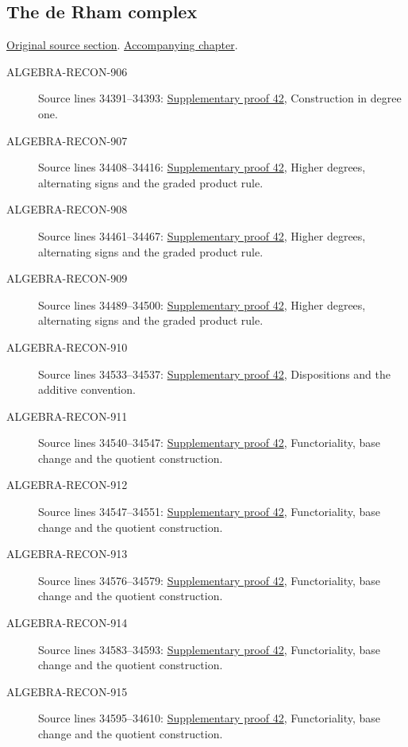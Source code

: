 \subsection{The de Rham complex}
\hypertarget{algebra-source-section-de-rham-complex}{}
\noindent\href{https://github.com/stacks/stacks-project/blob/a04446e57ec1fbc252a871afcec7752fb2807b14/algebra.tex\#L34387}{Original source section}. \href{algebra.pdf\#nameddest=section-de-rham-complex}{Accompanying chapter}.

\begin{description}
\item[ALGEBRA-RECON-906] Source lines 34391--34393: \hyperlink{algebra_de_rham_notes_20260928}{Supplementary proof 42}, Construction in degree one.
\item[ALGEBRA-RECON-907] Source lines 34408--34416: \hyperlink{algebra_de_rham_notes_20260928}{Supplementary proof 42}, Higher degrees, alternating signs and the graded product rule.
\item[ALGEBRA-RECON-908] Source lines 34461--34467: \hyperlink{algebra_de_rham_notes_20260928}{Supplementary proof 42}, Higher degrees, alternating signs and the graded product rule.
\item[ALGEBRA-RECON-909] Source lines 34489--34500: \hyperlink{algebra_de_rham_notes_20260928}{Supplementary proof 42}, Higher degrees, alternating signs and the graded product rule.
\item[ALGEBRA-RECON-910] Source lines 34533--34537: \hyperlink{algebra_de_rham_notes_20260928}{Supplementary proof 42}, Dispositions and the additive convention.
\item[ALGEBRA-RECON-911] Source lines 34540--34547: \hyperlink{algebra_de_rham_notes_20260928}{Supplementary proof 42}, Functoriality, base change and the quotient construction.
\item[ALGEBRA-RECON-912] Source lines 34547--34551: \hyperlink{algebra_de_rham_notes_20260928}{Supplementary proof 42}, Functoriality, base change and the quotient construction.
\item[ALGEBRA-RECON-913] Source lines 34576--34579: \hyperlink{algebra_de_rham_notes_20260928}{Supplementary proof 42}, Functoriality, base change and the quotient construction.
\item[ALGEBRA-RECON-914] Source lines 34583--34593: \hyperlink{algebra_de_rham_notes_20260928}{Supplementary proof 42}, Functoriality, base change and the quotient construction.
\item[ALGEBRA-RECON-915] Source lines 34595--34610: \hyperlink{algebra_de_rham_notes_20260928}{Supplementary proof 42}, Functoriality, base change and the quotient construction.

\end{description}
